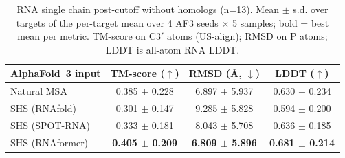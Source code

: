 \begin{table}[htbp]
\centering
\caption{RNA single chain post-cutoff without homologs (n=13). Mean $\pm$ s.d. over targets of the per-target mean over 4 AF3 seeds $\times$ 5 samples; bold = best mean per metric. TM-score on C3$'$ atoms (US-align); RMSD on P atoms; LDDT is all-atom RNA LDDT.}
\label{tab:rna_single_chain_post_cutoff_without_homologs}
\begin{tabular}{lccc}
\toprule
AlphaFold~3 input & TM-score ($\uparrow$) & RMSD (\AA, $\downarrow$) & LDDT ($\uparrow$) \\
\midrule
Natural MSA & 0.385 $\pm$ 0.228 & 6.897 $\pm$ 5.937 & 0.630 $\pm$ 0.234 \\
SHS (RNAfold) & 0.301 $\pm$ 0.147 & 9.285 $\pm$ 5.828 & 0.594 $\pm$ 0.200 \\
SHS (SPOT-RNA) & 0.333 $\pm$ 0.181 & 8.043 $\pm$ 5.708 & 0.636 $\pm$ 0.185 \\
SHS (RNAformer) & \textbf{0.405 $\pm$ 0.209} & \textbf{6.809 $\pm$ 5.896} & \textbf{0.681 $\pm$ 0.214} \\
\bottomrule
\end{tabular}
\end{table}
